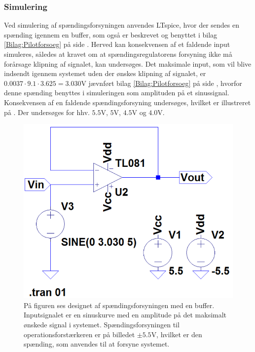 \subsubsection{Simulering}
Ved simulering af spændingsforsyningen anvendes LTspice, hvor der sendes en spænding igennem en buffer, som også er beskrevet og benyttet i bilag \ref{Bilag:Pilotforsoeg} på side \pageref{Bilag:Pilotforsoeg}. Herved kan konsekvensen af et faldende input simuleres, således at kravet om at spændingsregulatorens forsyning ikke må forårsage klipning af signalet, kan undersøges. Det maksimale input, som vil blive indsendt igennem systemet uden der ønskes klipning af signalet, er $0.0037 \cdot 9.1 \cdot 3.6 25 = 3.030$V jævnført bilag \ref{Bilag:Pilotforsoeg} på side \pageref{Bilag:Pilotforsoeg}, hvorfor denne spænding benyttes i simuleringen som amplituden på et sinussignal. Konsekvensen af en faldende spændingsforsyning undersøges, hvilket er illustreret på . Der undersøges for hhv. $5.5$V, $5$V, $4.5$V og $4.0$V.
\begin{figure}[H]
	\centering
	\includegraphics[scale=0.4]{figures/cProblemloesning/Spaendingsforsyning_LTspice2.PNG}
	\caption{På figuren ses designet af spændingsforsyningen med en buffer. Inputsignalet er en sinuskurve med en amplitude på det maksimalt ønskede signal i systemet. Spændingsforsyningen til operationsforstærkeren er på billedet $\pm5.5$V, hvilket er den spænding, som anvendes til at forsyne systemet.}
	\label{fig:spaendingsforsyning}
\end{figure}
